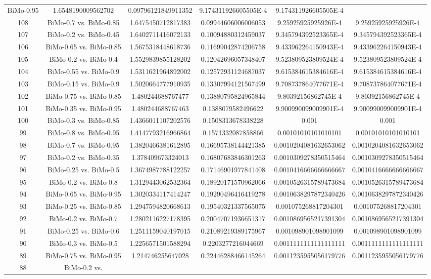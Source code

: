 \documentclass[a4paper,10pt]{article}
\begin{document}
\begin{landscape}
\begin{table}[!htp]
\begin{tabular}{cccccc}
BiMo-0.95&1.6548190009562702&0.09796121849911352&9.174311926605505E-4&9.174311926605505E-4\\108&BiMo-0.7 vs. BiMo-0.85&1.6475450712817383&0.09944606006006053&9.25925925925926E-4&9.25925925925926E-4\\107&BiMo-0.2 vs. BiMo-0.45&1.6402711416072133&0.10094880312459037&9.345794392523365E-4&9.345794392523365E-4\\106&BiMo-0.65 vs. BiMo-0.85&1.5675318448618736&0.11699042874206758&9.433962264150943E-4&9.433962264150943E-4\\105&BiMo-0.2 vs. BiMo-0.4&1.5529839855128202&0.12042696057348407&9.523809523809524E-4&9.523809523809524E-4\\104&BiMo-0.55 vs. BiMo-0.9&1.5311621964892002&0.12572931124687037&9.615384615384616E-4&9.615384615384616E-4\\103&BiMo-0.15 vs. BiMo-0.9&1.5020664777910935&0.13307994121567499&9.708737864077671E-4&9.708737864077671E-4\\102&BiMo-0.75 vs. BiMo-0.85&1.480244688767477&0.13880795824965844&9.80392156862745E-4&9.80392156862745E-4\\101&BiMo-0.35 vs. BiMo-0.95&1.480244688767463&0.1388079582496622&9.900990099009901E-4&9.900990099009901E-4\\100&BiMo-0.3 vs. BiMo-0.85&1.4366011107202576&0.1508313678338228&0.001&0.001\\99&BiMo-0.8 vs. BiMo-0.95&1.4147793216966864&0.1571332087858866&0.00101010101010101&0.00101010101010101\\98&BiMo-0.7 vs. BiMo-0.95&1.3820466381612895&0.16695738144421385&0.0010204081632653062&0.0010204081632653062\\97&BiMo-0.2 vs. BiMo-0.35&1.378409673324013&0.16807683846301263&0.0010309278350515464&0.0010309278350515464\\96&BiMo-0.25 vs. BiMo-0.5&1.3674987788122257&0.17146901977841408&0.0010416666666666667&0.0010416666666666667\\95&BiMo-0.2 vs. BiMo-0.8&1.3129443062532364&0.18920171570962066&0.0010526315789473684&0.0010526315789473684\\94&BiMo-0.65 vs. BiMo-0.95&1.3020334117414247&0.19290496416419278&0.0010638297872340426&0.0010638297872340426\\93&BiMo-0.25 vs. BiMo-0.85&1.2947594820668613&0.19540321337565075&0.001075268817204301&0.001075268817204301\\92&BiMo-0.2 vs. BiMo-0.7&1.2802116227178395&0.20047071936651317&0.0010869565217391304&0.0010869565217391304\\91&BiMo-0.25 vs. BiMo-0.6&1.2511159040197015&0.21089219389175967&0.001098901098901099&0.001098901098901099\\90&BiMo-0.3 vs. BiMo-0.5&1.2256571501588294&0.2203277216044669&0.0011111111111111111&0.0011111111111111111\\89&BiMo-0.75 vs. BiMo-0.95&1.214746255647028&0.22446288466145264&0.0011235955056179776&0.0011235955056179776\\88&BiMo-0.2 vs. 
\end{tabular}
\end{table}
\end{landscape}
\end{document}
